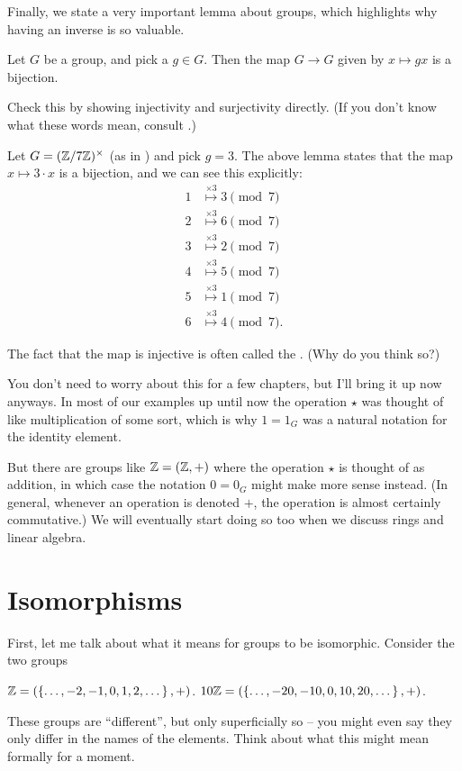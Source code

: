 Finally, we state a very important lemma about groups,
which highlights why having an inverse is so valuable.
\begin{lemma}
	Let $G$ be a group, and pick a $g \in G$.
	Then the map $G \to G$ given by $x \mapsto gx$ is a bijection.
	\label{lem:group_mult_biject}
\end{lemma}
\begin{exercise}
	Check this by showing injectivity and surjectivity directly.
	(If you don't know what these words mean,
	consult .)
\end{exercise}
\begin{example}
	Let $G = (\mathbb Z/7\mathbb Z)^\times$ (as in ) and pick $g=3$.
	The above lemma states that the map $x \mapsto 3 \cdot x$ is a bijection, and we can see this explicitly:
	\begin{align*}
		1 &\overset{\times 3}{\longmapsto} 3 \pmod 7 \\
		2 &\overset{\times 3}{\longmapsto} 6 \pmod 7 \\
		3 &\overset{\times 3}{\longmapsto} 2 \pmod 7 \\
		4 &\overset{\times 3}{\longmapsto} 5 \pmod 7 \\
		5 &\overset{\times 3}{\longmapsto} 1 \pmod 7 \\
		6 &\overset{\times 3}{\longmapsto} 4 \pmod 7.
	\end{align*}
\end{example}
The fact that the map is injective is often called the .
(Why do you think so?)

\begin{abuse}
	You don't need to worry about this for a few chapters,
	but I'll bring it up now anyways.
	In most of our examples up until now the operation $\star$
	was thought of like multiplication of some sort,
	which is why $1 = 1_G$ was a natural notation for the identity element.

	But there are groups like $\mathbb Z = (\mathbb Z,+)$
	where the operation $\star$ is thought of as addition,
	in which case the notation $0 = 0_G$ might make more sense instead.
	(In general, whenever an operation is denoted $+$,
	the operation is almost certainly commutative.)
	We will eventually start doing so too
	when we discuss rings and linear algebra.
\end{abuse}

\section{Isomorphisms}
First, let me talk about what it means for groups to be isomorphic.
Consider the two groups
\begin{itemize}
	\ii $\mathbb Z = (\left\{ \dots,-2,-1,0,1,2,\dots \right\}, +)$.
	\ii $10\mathbb Z = (\left\{ \dots, -20, -10, 0, 10, 20, \dots \right\}, +)$.
\end{itemize}
These groups are ``different'', but only superficially so -- you might even say they only differ in the names of the elements.
Think about what this might mean formally for a moment.

